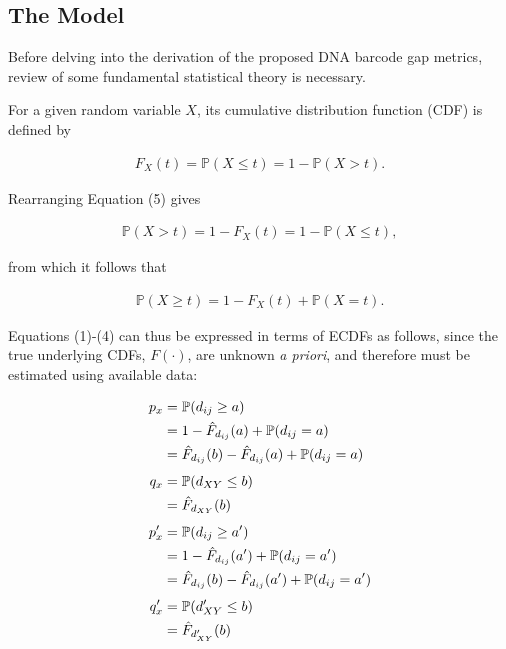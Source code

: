 \documentclass[12pt]{article}
\begin{document}
\subsection{The Model}

Before delving into the derivation of the proposed DNA barcode gap metrics, review of some fundamental statistical theory is necessary.

For a given random variable $X$, its cumulative distribution function (CDF) is defined by

\begin{align}
F_X(t) = \mathbb{P}(X \leq t) = 1 - \mathbb{P}(X > t). 
\end{align}

\noindent Rearranging Equation (5) gives

\begin{align}
\mathbb{P}(X > t) = 1 - F_X(t) = 1 - \mathbb{P}(X \leq t) ,
\end{align}

\noindent from which it follows that

\begin{align}
\mathbb{P}(X \geq t) = 1 - F_X(t) + \mathbb{P}(X = t).
\end{align}

Equations (1)-(4) can thus be expressed in terms of ECDFs as follows, since the true underlying CDFs, $F(\cdot)$, are unknown \textit{a priori}, and therefore must be estimated using available data:

\begin{align}
p_x  &= \mathbb{P}(d_{ij} \geq a) \notag \\
     &= 1 - \hat{F}_{d_{ij}}(a) + \mathbb{P}(d_{ij} = a) \notag \\
     &= \hat{F}_{d_{ij}}(b) - \hat{F}_{d_{ij}}(a) +  \mathbb{P}(d_{ij} = a) \\[1ex]
q_x  &=  \mathbb{P}(d_{XY} \leq b) \notag \\
     &= \hat{F}_{d_{XY}}(b) \\[1ex]
p'_x &=  \mathbb{P}(d_{ij} \geq a') \notag \\
     &= 1 - \hat{F}_{d_{ij}}(a') +  \mathbb{P}(d_{ij} = a') \notag \\
     &= \hat{F}_{d_{ij}}(b) - \hat{F}_{d_{ij}}(a') +  \mathbb{P}(d_{ij} = a')  \\[1ex]
q'_x &=  \mathbb{P}(d'_{XY} \leq b) \notag \\
     &= \hat{F}_{d'_{XY}}(b)
\end{align}
\end{document}
